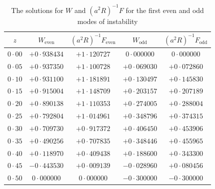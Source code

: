 \begin{table}[htbp]
\centering
\caption{The solutions for $W$ and $(a^2 R)^{-1}F$ for the first even and odd modes of instability}
\label{tab:2-II}
\medskip
\begin{tabular}{@{}c cccc@{}}
\toprule
$z$ & $W_{\text{even}}$ & $(a^2R)^{-1}F_{\text{even}}$ & $W_{\text{odd}}$ & $(a^2R)^{-1}F_{\text{odd}}$ \\
\midrule
$0{\cdot}00$ & $+0{\cdot}938434$ & $+1{\cdot}120727$ & $0{\cdot}000000$ & $0{\cdot}000000$\\
$0{\cdot}05$ & $+0{\cdot}937350$ & $+1{\cdot}100728$ & $+0{\cdot}069030$ & $+0{\cdot}072860$\\
$0{\cdot}10$ & $+0{\cdot}931100$ & $+1{\cdot}181891$ & $+0{\cdot}130497$ & $+0{\cdot}145830$\\
$0{\cdot}15$ & $+0{\cdot}915004$ & $+1{\cdot}148709$ & $+0{\cdot}203157$ & $+0{\cdot}207189$\\
$0{\cdot}20$ & $+0{\cdot}890138$ & $+1{\cdot}110353$ & $+0{\cdot}274005$ & $+0{\cdot}288004$\\
$0{\cdot}25$ & $+0{\cdot}792804$ & $+1{\cdot}014961$ & $+0{\cdot}348796$ & $+0{\cdot}374315$\\
$0{\cdot}30$ & $+0{\cdot}709730$ & $+0{\cdot}917372$ & $+0{\cdot}406450$ & $+0{\cdot}453906$\\
$0{\cdot}35$ & $+0{\cdot}490256$ & $+0{\cdot}707835$ & $+0{\cdot}348446$ & $+0{\cdot}455965$\\
$0{\cdot}40$ & $+0{\cdot}118970$ & $+0{\cdot}409438$ & $+0{\cdot}188600$ & $+0{\cdot}343300$\\
$0{\cdot}45$ & $-0{\cdot}443530$ & $+0{\cdot}009139$ & $-0{\cdot}028960$ & $+0{\cdot}080456$\\
$0{\cdot}50$ & $0{\cdot}000000$ & $0{\cdot}000000$ & $-0{\cdot}300000$ & $-0{\cdot}300000$\\
\bottomrule
\end{tabular}
\end{table}






